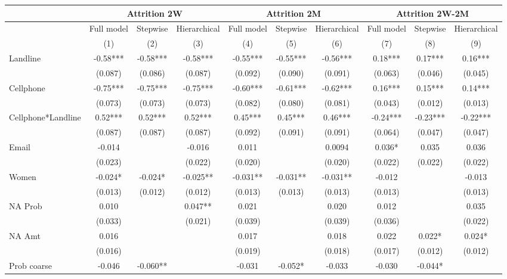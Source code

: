 \begin{tabular}{lccccccccc}
\toprule
      & \multicolumn{3}{c}{Attrition 2W} & \multicolumn{3}{c}{Attrition 2M} & \multicolumn{3}{c}{Attrition 2W-2M} \\
\midrule
\midrule
      & Full model & Stepwise & Hierarchical & Full model & Stepwise & Hierarchical & Full model & Stepwise & Hierarchical \\
\midrule
      & (1)   & (2)   & (3)   & (4)   & (5)   & (6)   & (7)   & (8)   & (9) \\
\midrule
\midrule
Landline & -0.58*** & -0.58*** & -0.58*** & -0.55*** & -0.55*** & -0.56*** & 0.18*** & 0.17*** & 0.16*** \\
      & (0.087) & (0.086) & (0.087) & (0.092) & (0.090) & (0.091) & (0.063) & (0.046) & (0.045) \\
Cellphone & -0.75*** & -0.75*** & -0.75*** & -0.60*** & -0.61*** & -0.62*** & 0.16*** & 0.15*** & 0.14*** \\
      & (0.073) & (0.073) & (0.073) & (0.082) & (0.080) & (0.081) & (0.043) & (0.012) & (0.013) \\
Cellphone*Landline & 0.52*** & 0.52*** & 0.52*** & 0.45*** & 0.45*** & 0.46*** & -0.24*** & -0.23*** & -0.22*** \\
      & (0.087) & (0.087) & (0.087) & (0.092) & (0.091) & (0.091) & (0.064) & (0.047) & (0.047) \\
Email & -0.014 &       & -0.016 & 0.011 &       & 0.0094 & 0.036* & 0.035 & 0.036 \\
      & (0.023) &       & (0.022) & (0.020) &       & (0.020) & (0.022) & (0.022) & (0.022) \\
Women & -0.024* & -0.024* & -0.025** & -0.031** & -0.031** & -0.031** & -0.012 &       & -0.013 \\
      & (0.013) & (0.012) & (0.012) & (0.013) & (0.013) & (0.013) & (0.013) &       & (0.013) \\
NA Prob & 0.010 &       & 0.047** & 0.021 &       & 0.020 & 0.012 &       & 0.035 \\
      & (0.033) &       & (0.021) & (0.039) &       & (0.039) & (0.036) &       & (0.022) \\
NA Amt & 0.016 &       &       & 0.017 &       & 0.018 & 0.022 & 0.022* & 0.024* \\
      & (0.016) &       &       & (0.019) &       & (0.018) & (0.017) & (0.012) & (0.012) \\
Prob coarse & -0.046 & -0.060** &       & -0.031 & -0.052* & -0.033 & -0.030 & -0.044* &  \\

\end{tabular}
